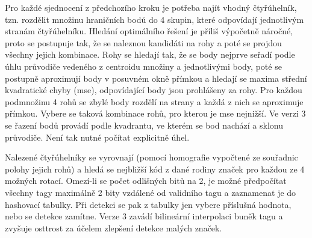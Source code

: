   Pro každé sjednocení z předchozího kroku je potřeba najít vhodný čtyřúhelník, tzn. rozdělit množinu hraničních bodů do 4 skupin, které odpovídají jednotlivým stranám čtyřúhelníku. Hledání optimálního řešení je příliš výpočetně náročné, proto se postupuje tak, že se naleznou kandidáti na rohy a poté se projdou všechny jejich kombinace. Rohy se hledají tak, že se body nejprve seřadí podle úhlu průvodiče vedeného z centroidu množiny a jednotlivými body, poté se postupně aproximují body v posuvném okně přímkou a hledají se maxima střední kvadratické chyby (\acrshort{mse}), odpovídající body jsou prohlášeny za rohy. Pro každou podmnožinu 4 rohů se zbylé body rozdělí na strany a každá z nich se aproximuje přímkou. Vybere se taková kombinace rohů, pro kterou je \acrshort{mse} nejnižší. \cite{apriltag2} Ve verzi 3 se řazení bodů provádí podle kvadrantu, ve kterém se bod nachází a sklonu průvodiče. Není tak nutné počítat explicitně úhel. \cite{apriltag3}

  Nalezené čtyřúhelníky se vyrovnají (pomocí homografie vypočtené ze souřadnic polohy jejich rohů) a hledá se nejbližší kód z dané rodiny značek pro každou ze 4 možných rotací. Omezí-li se počet odlišných bitů na 2, je možné předpočítat všechny tagy maximálně 2 bity vzdálené od validního tagu a zaznamenat je do hashovací tabulky. Při detekci se pak z tabulky jen vybere příslušná hodnota, nebo se detekce zamítne. \cite{apriltag2} Verze 3 zavádí bilineární interpolaci buněk tagu a zvyšuje osttrost za účelem zlepšení detekce malých značek. \cite{apriltag3}